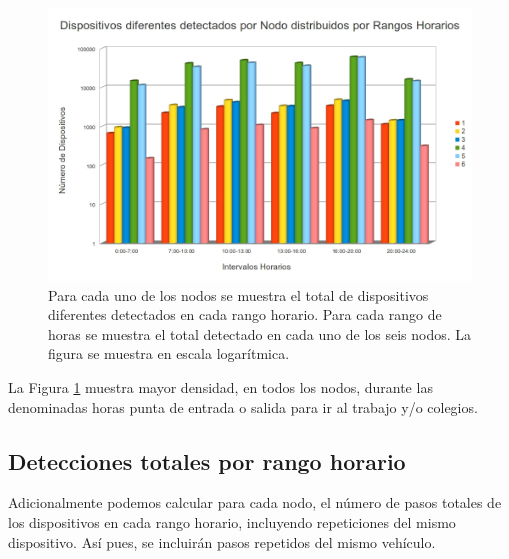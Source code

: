 \documentclass[twocolumn,twoside]{Jornadas}
\begin{document}
 \begin{figure}[htb]
 \begin{center}
 \includegraphics[scale=0.20]{VehiculosDiferentesPorHoras.jpg}
 \caption{Para cada uno de los nodos se muestra el total de dispositivos diferentes detectados en cada rango horario. Para cada rango de horas se muestra el total detectado en cada uno de los seis nodos. La figura se muestra en escala logarítmica.
 \label{VehiculosDiferentesPorHoras}}
 \end{center}
 \end{figure}
 
La Figura \ref{VehiculosDiferentesPorHoras} muestra mayor densidad, en todos los nodos, durante las denominadas horas punta de entrada o salida para ir al trabajo y/o colegios.



\subsection{Detecciones totales por rango horario}


Adicionalmente podemos calcular para cada nodo, el número de pasos totales de los dispositivos en cada rango horario, incluyendo repeticiones del mismo dispositivo. 
Así pues, se incluirán pasos repetidos del mismo vehículo.
\end{document}
